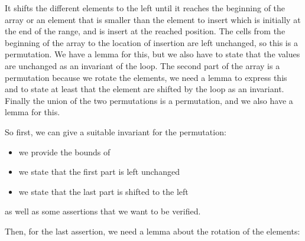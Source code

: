 It shifts the different elements to the left until it reaches the beginning of
the array or an element that is smaller than the element to insert which is
initially at the end of the range, and is insert at the reached position. The
cells from the beginning of the array to the location of insertion are left
unchanged, so this is a permutation. We have a lemma for this, but we also have
to state that the values are unchanged as an invariant of the loop. The second
part of the array is a permutation because we rotate the elements, we need a
lemma to express this and to state at least that the element are shifted by the
loop as an invariant. Finally the union of the two permutations is a permutation,
and we also have a lemma for this.



So first, we can give a suitable invariant for the permutation:

\begin{itemize}
\item we provide the bounds of 
\item we state that the first part is left unchanged
\item we state that the last part is shifted to the left
\end{itemize}

as well as some assertions that we want to be verified.









Then, for the last assertion, we need a lemma about the rotation of the
elements:





